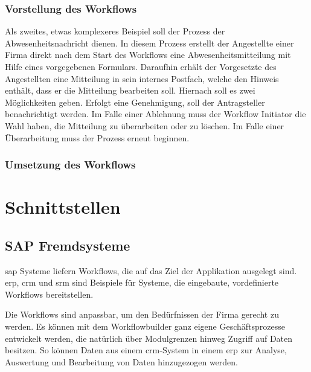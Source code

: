 \subsubsection{Vorstellung des Workflows}
\label{sec:builder-2-bsp-vorstellung}
Als zweites, etwas komplexeres Beispiel soll der Prozess der Abwesenheitsnachricht dienen. In diesem Prozess erstellt der Angestellte einer Firma direkt nach dem Start des Workflows eine Abwesenheitsmitteilung mit Hilfe eines vorgegebenen Formulars. Daraufhin erhält der Vorgesetzte des Angestellten eine Mitteilung in sein internes Postfach, welche den Hinweis enthält, dass er die Mitteilung bearbeiten soll. Hiernach soll es zwei Möglichkeiten geben. Erfolgt eine Genehmigung, soll der Antragsteller benachrichtigt werden. Im Falle einer Ablehnung muss der Workflow Initiator die Wahl haben, die Mitteilung zu überarbeiten oder zu löschen. Im Falle einer Überarbeitung muss der Prozess erneut beginnen.

\subsubsection{Umsetzung des Workflows}
\label{sec:builder-2-bsp-umsetzung}


\section{Schnittstellen}

\subsection{SAP Fremdsysteme}
\label{sec:export-sap}

\gls{sap} Systeme liefern Workflows, die auf das Ziel der Applikation ausgelegt sind. \gls{erp}, \gls{crm} und \gls{srm} sind Beispiele für Systeme, die eingebaute, vordefinierte Workflows bereitstellen. 

Die Workflows sind anpassbar, um den Bedürfnissen der Firma gerecht zu werden. Es können mit dem Workflowbuilder ganz eigene Geschäftsprozesse entwickelt werden, die natürlich über Modulgrenzen hinweg Zugriff auf Daten besitzen. So können Daten aus einem \gls{crm}-System in einem \gls{erp} zur Analyse, Auswertung und Bearbeitung von Daten hinzugezogen werden.

